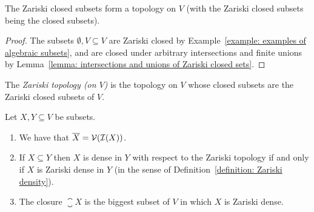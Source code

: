\begin{corollary}
  The Zariski closed subsets form a topology on $V$ (with the Zariski closed subsets being the closed subsets).
\end{corollary}


\begin{proof}
  The subsets $\emptyset, V \subseteq V$ are Zariski closed by Example~\ref{example: examples of algebraic subsets}, and are closed under arbitrary intersections and finite unions by Lemma~\ref{lemma: intersections and unions of Zariski closed sets}.
\end{proof}


\begin{definition}
  The \emph{Zariski topology \textup(on $V$\textup)} is the topology on $V$ whose closed subsets are the Zariski closed subsets of $V$.
\end{definition}


\begin{proposition}
  \label{proposition: characterization of Zariski closed and Zariski dense}
  Let $X, Y \subseteq V$ be subsets.
  \begin{enumerate}
    \item
      We have that $\overline{X} = \mathcal{V}(\mathcal{I}(X))$.
    \item
      If $X \subseteq Y$ then $X$ is dense in $Y$ with respect to the Zariski topology if and only if $X$ is Zariski dense in $Y$ (in the sense of Definition~\ref{definition: Zariski density}).
    \item
      The closure $\closure{X}$ is the biggest subset of $V$ in which $X$ is Zariski dense.
  \end{enumerate}
\end{proposition}


